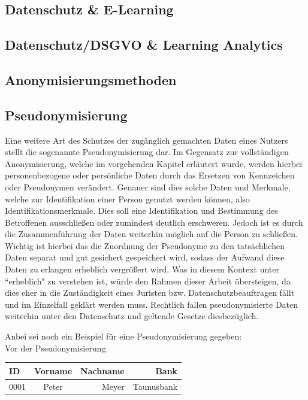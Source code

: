 \documentclass[a4paper, 12pt]{article}
\begin{document}
\subsection{Datenschutz \& E-Learning}

\subsection{Datenschutz/DSGVO \& Learning Analytics}

\subsection{Anonymisierungsmethoden}

\subsection{Pseudonymisierung}

Eine weitere Art des Schutzes der zugänglich gemachten Daten eines Nutzers stellt die sogenannte Pseudonymisierung dar. Im Gegensatz zur vollständigen Anonymisierung, welche im vorgehenden Kapitel erläutert wurde, werden hierbei personenbezogene oder persönliche Daten durch das Ersetzen von Kennzeichen oder Pseudonymen verändert. Genauer sind dies solche Daten und Merkmale, welche zur Identifikation einer Person genutzt werden können, also Identifikationsmerkmale. Dies soll eine Identifikation und Bestimmung des Betroffenen ausschließen oder zumindest deutlich erschweren. Jedoch ist es durch die Zusammenführung der Daten weiterhin möglich auf die Person zu schließen. Wichtig ist hierbei das die Zuordnung der Pseudonyme zu den tatsächlichen Daten separat und gut gesichert gespeichert wird, sodass der Aufwand diese Daten zu erlangen erheblich vergrößert wird. Was in diesem Kontext unter ``erheblich" zu verstehen ist, würde den Rahmen dieser Arbeit übersteigen, da dies eher in die Zuständigkeit eines Juristen bzw. Datenschutzbeauftragen fällt und im Einzelfall geklärt werden muss. Rechtlich fallen pseudonymisierte Daten weiterhin unter den Datenschutz und geltende Gesetze diesbezüglich.
\cite{thesing_anonym_pseudonym, datenschutz_pseudonymisierung}

\noindent Anbei sei noch ein Beispiel für eine Pseudonymisierung gegeben:\\

\noindent Vor der Pseudonymisierung:\\

\begin{tabular}{lcrr}
	
	ID & Vorname & Nachname & Bank \\
	\hline
	0001 & Peter & Meyer & Taunusbank
	
\end{tabular}\\
\end{document}
